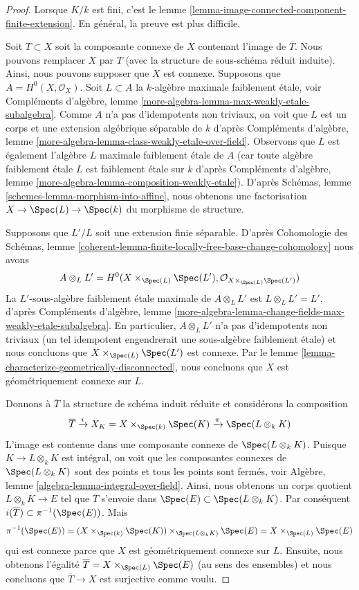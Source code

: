 \begin{proof}
Lorsque $K/k$ est fini, c'est le lemme
\ref{lemma-image-connected-component-finite-extension}.
En général, la preuve est plus difficile.

\medskip\noindent
Soit $T \subset X$ soit la composante connexe de $X$
contenant l'image de $\overline{T}$. Nous pouvons remplacer $X$ par
$T$ (avec la structure de sous-schéma réduit induite). Ainsi, nous
pouvons supposer que $X$ est connexe. Supposons que $A = H^0(X,
\mathcal{O}_X)$. Soit $L \subset A$ la $k$-algèbre maximale faiblement
étale, voir Compléments d'algèbre, lemme
\ref{more-algebra-lemma-max-weakly-etale-subalgebra}. Comme $A$ n'a pas
d'idempotents non triviaux, on voit que $L$ est un corps et une
extension algébrique séparable de $k$ d'après Compléments d'algèbre, lemme
\ref{more-algebra-lemma-class-weakly-etale-over-field}. Observons que $L$
est également l'algèbre $L$ maximale faiblement étale de $A$ (car toute
algèbre faiblement étale $L$ est faiblement étale sur $k$ d'après
Compléments d'algèbre, lemme \ref{more-algebra-lemma-composition-weakly-etale}).
D'après Schémas, lemme \ref{schemes-lemma-morphism-into-affine}, nous
obtenons une factorisation $X \to \Spec(L) \to \Spec(k)$ du morphisme de structure.

\medskip\noindent
Supposons que $L'/L$ soit une extension
finie séparable. D'après Cohomologie des
Schémas, lemme
\ref{coherent-lemma-finite-locally-free-base-change-cohomology} nous avons
$$
A \otimes_L L' =
H^0(X \times_{\Spec(L)} \Spec(L'), \mathcal{O}_{X \times_{\Spec(L)} \Spec(L')})
$$
La $L'$-sous-algèbre faiblement étale maximale de $A \otimes_L
L'$ est $L \otimes_L L' = L'$, d'après Compléments d'algèbre, lemme
\ref{more-algebra-lemma-change-fields-max-weakly-etale-subalgebra}.
En particulier, $A \otimes_L L'$ n'a pas d'idempotents non
triviaux (un tel idempotent engendrerait une sous-algèbre faiblement
étale) et nous concluons que $X \times_{\Spec(L)} \Spec(L')$ est
connexe. Par le lemme
\ref{lemma-characterize-geometrically-disconnected}, nous concluons que $X$ est géométriquement connexe sur $L$.

\medskip\noindent
Donnons à $\overline{T}$ la structure de
schéma induit réduite et considérons la composition
$$
\overline{T} \xrightarrow{i} X_K = X \times_{\Spec(k)} \Spec(K)
\xrightarrow{\pi}
\Spec(L \otimes_k K)
$$
L'image est contenue dans une composante connexe de $\Spec(L
\otimes_k K)$. Puisque $K \to L \otimes_k K$ est intégral,
on voit que les composantes connexes de $\Spec(L \otimes_k
K)$ sont des points et tous les points sont fermés, voir
Algèbre, lemme \ref{algebra-lemma-integral-over-field}. Ainsi,
nous obtenons un corps quotient $L \otimes_k K \to E$ tel que
$\overline{T}$ s'envoie dans $\Spec(E) \subset \Spec(L \otimes_k
K)$. Par conséquent $i(\overline{T}) \subset \pi^{-1}(\Spec(E))$. Mais
$$
\pi^{-1}(\Spec(E)) =
(X \times_{\Spec(k)} \Spec(K)) \times_{\Spec(L \otimes_k K)} \Spec(E) =
X \times_{\Spec(L)} \Spec(E)
$$
qui est connexe parce que $X$ est géométriquement connexe sur
$L$. Ensuite, nous obtenons l'égalité $\overline{T} = X
\times_{\Spec(L)} \Spec(E)$ (au sens des ensembles) et nous
concluons que $\overline{T} \to X$ est surjective comme voulu.
\end{proof}

